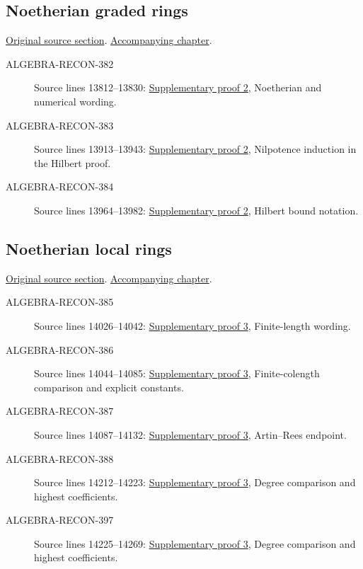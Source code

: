 \subsection{Noetherian graded rings}
\hypertarget{algebra-source-section-noetherian-graded}{}
\noindent\href{https://github.com/stacks/stacks-project/blob/a04446e57ec1fbc252a871afcec7752fb2807b14/algebra.tex\#L13774}{Original source section}. \href{algebra.pdf\#nameddest=section-noetherian-graded}{Accompanying chapter}.

\begin{description}
\item[ALGEBRA-RECON-382] Source lines 13812--13830: \hyperlink{algebra_graded_proj_hilbert_notes_20260927}{Supplementary proof 2}, Noetherian and numerical wording.
\item[ALGEBRA-RECON-383] Source lines 13913--13943: \hyperlink{algebra_graded_proj_hilbert_notes_20260927}{Supplementary proof 2}, Nilpotence induction in the Hilbert proof.
\item[ALGEBRA-RECON-384] Source lines 13964--13982: \hyperlink{algebra_graded_proj_hilbert_notes_20260927}{Supplementary proof 2}, Hilbert bound notation.
\end{description}

\subsection{Noetherian local rings}
\hypertarget{algebra-source-section-Noetherian-local}{}
\noindent\href{https://github.com/stacks/stacks-project/blob/a04446e57ec1fbc252a871afcec7752fb2807b14/algebra.tex\#L13991}{Original source section}. \href{algebra.pdf\#nameddest=section-Noetherian-local}{Accompanying chapter}.

\begin{description}
\item[ALGEBRA-RECON-385] Source lines 14026--14042: \hyperlink{algebra_local_hilbert_dimension_notes_20260927}{Supplementary proof 3}, Finite-length wording.
\item[ALGEBRA-RECON-386] Source lines 14044--14085: \hyperlink{algebra_local_hilbert_dimension_notes_20260927}{Supplementary proof 3}, Finite-colength comparison and explicit constants.
\item[ALGEBRA-RECON-387] Source lines 14087--14132: \hyperlink{algebra_local_hilbert_dimension_notes_20260927}{Supplementary proof 3}, Artin–Rees endpoint.
\item[ALGEBRA-RECON-388] Source lines 14212--14223: \hyperlink{algebra_local_hilbert_dimension_notes_20260927}{Supplementary proof 3}, Degree comparison and highest coefficients.
\item[ALGEBRA-RECON-397] Source lines 14225--14269: \hyperlink{algebra_local_hilbert_dimension_notes_20260927}{Supplementary proof 3}, Degree comparison and highest coefficients.
\end{description}

